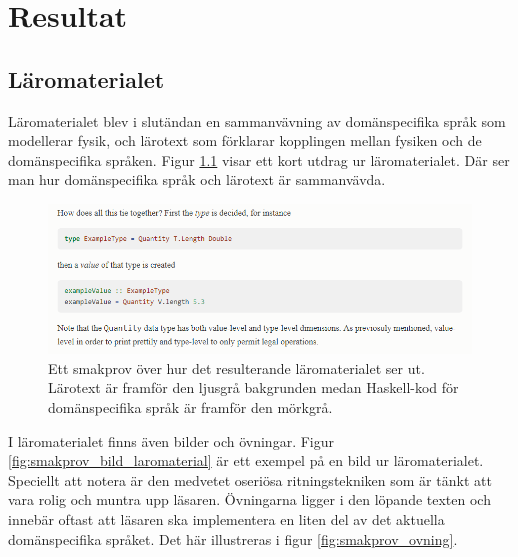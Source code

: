 
\chapter{Resultat}

\begin{draft}

\section{Läromaterialet}

Läromaterialet blev i slutändan en sammanvävning av domänspecifika språk som modellerar fysik, och lärotext som förklarar kopplingen mellan fysiken och de domänspecifika språken. Figur \ref{fig:smakprov_laromaterial} visar ett kort utdrag ur läromaterialet. Där ser man hur domänspecifika språk och lärotext är sammanvävda.

\begin{figure}[tph]
  \includegraphics[width=\linewidth]{figure/smakprov_laromaterial.png}
  \caption{Ett smakprov över hur det resulterande läromaterialet ser ut. Lärotext är framför den ljusgrå bakgrunden medan Haskell-kod för domänspecifika språk är framför den mörkgrå.}
  \label{fig:smakprov_laromaterial}
\end{figure}

I läromaterialet finns även bilder och övningar. Figur \ref{fig:smakprov_bild_laromaterial} är ett exempel på en bild ur läromaterialet. Speciellt att notera är den medvetet oseriösa ritningstekniken som är tänkt att vara rolig och muntra upp läsaren. Övningarna ligger i den löpande texten och innebär oftast att läsaren ska implementera en liten del av det aktuella domänspecifika språket. Det här illustreras i figur \ref{fig:smakprov_ovning}.


\end{draft}
